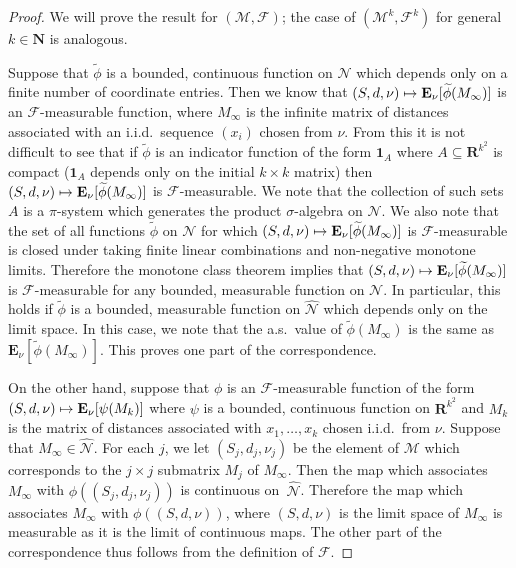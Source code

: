 \documentclass[JEP,XML,SOM,Unicode]{cedram}
\let\mathcal\mathscr
\newcommand\mto{\mathchoice{\longmapsto}{\mapsto}{\mapsto}{\mapsto}}
\theoremstyle{plain}
\numberwithin{theorem}{section}
\theoremstyle{definition}
\newcommand{\CF}{{\mathcal F}}
\newcommand\mmspace{{\mathcal M}}
\newcommand\mmsigma{{\mathcal F}}
\newcommand{\matrixmspace}{\mathcal N}
\newcommand \E {{\mathbf E}}
\newcommand{\R}{\mathbf{R}}
\newcommand{\N}{\mathbf{N}}
\newcommand{\one}{{\mathbf 1}}
\let\wh\widehat
\let\wt\widetilde
\begin{document}
\begin{proof}
We will prove the result for $(\mmspace,\mmsigma)$; the case of $(\mmspace^k,\mmsigma^k)$ for general $k \in \N$ is analogous.

Suppose that $\wt{\phi}$ is a bounded, continuous function on $\matrixmspace$ which depends only on a finite number of coordinate entries. Then we know that $(S,d,\nu) \mto \E_\nu[ \wt{\phi}(M_\infty)]$ is an $\mmsigma$-measurable function, where $M_\infty$ is the infinite matrix of distances associated with an i.i.d.\ sequence $(x_i)$ chosen from $\nu$. From this it is not difficult to see that if $\wt{\phi}$ is an indicator function of the form $\one_A$ where $A \subseteq \R^{k^2}$ is compact (\ie $\one_A$ depends only on the initial $k \times k$ matrix) then $(S,d,\nu) \mto \E_\nu[ \wt{\phi}(M_\infty)]$ is $\mmsigma$-measurable. We note that the collection of such sets $A$ is a $\pi$-system which generates the product $\sigma$-algebra on $\matrixmspace$. We also note that the set of all functions $\wt{\phi}$ on $\matrixmspace$ for which $(S,d,\nu) \mto \E_\nu[ \wt{\phi}(M_\infty)]$ is $\mmsigma$\nobreakdash-measurable is closed under taking finite linear combinations and non-negative monotone limits. Therefore the monotone class theorem implies that $(S,d,\nu) \mto \E_\nu[\wt{\phi}(M_\infty)]$ is $\mmsigma$-measurable for any bounded, measurable function on $\matrixmspace$. In particular, this holds if $\wt{\phi}$ is a bounded, measurable function on $\wh{\matrixmspace}$ which depends only on the limit space. In this case, we note that the a.s.\ value of $\wt{\phi}(M_\infty)$ is the same as $\E_\nu[\wt{\phi}(M_\infty)]$. This proves one part of the correspondence.

On the other hand, suppose that $\phi$ is an $\mmsigma$-measurable function of the form $(S,d,\nu) \mto \E_\nu[\psi(M_k)]$ where $\psi$ is a bounded, continuous function on $\R^{k^2}$ and $M_k$ is the matrix of distances associated with $x_1,\ldots,x_k$ chosen i.i.d.\ from $\nu$. Suppose that $M_\infty \in \wh{\matrixmspace}$. For each $j$, we let $(S_j,d_j,\nu_j)$ be the element of $\mmspace$ which corresponds to the $j \times j$ submatrix $M_j$ of $M_\infty$. Then the map which associates $M_\infty$ with $\phi((S_j,d_j,\nu_j))$ is continuous on~$\wh{\matrixmspace}$. Therefore the map which associates $M_\infty$ with $\phi((S,d,\nu))$, where $(S,d,\nu)$ is the limit space of $M_\infty$ is measurable as it is the limit of continuous maps. The other part of the correspondence thus follows from the definition of $\CF$.
\end{proof}
\end{document}
